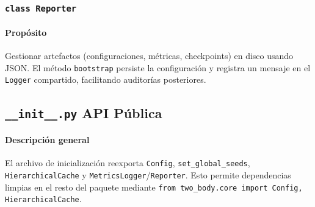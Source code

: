 \subsubsection{\texttt{class Reporter}}
\paragraph{Propósito} Gestionar artefactos (configuraciones, métricas, checkpoints) en disco usando JSON. El método \texttt{bootstrap} persiste la configuración y registra un mensaje en el \texttt{Logger} compartido, facilitando auditorías posteriores.

\subsection{\texttt{\_\_init\_\_.py} \- API Pública}
\paragraph{Descripción general}
El archivo de inicialización reexporta \texttt{Config}, \texttt{set\_global\_seeds}, \texttt{HierarchicalCache} y \texttt{MetricsLogger}/\texttt{Reporter}. Esto permite dependencias limpias en el resto del paquete mediante \texttt{from two\_body.core import Config, HierarchicalCache}.
